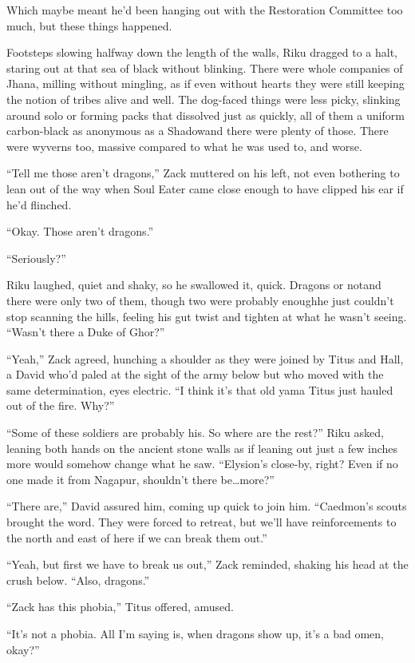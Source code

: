 Which maybe meant he'd been hanging out with the Restoration Committee too much, but these things happened.

Footsteps slowing halfway down the length of the walls, Riku dragged to a halt, staring out at that sea of black without blinking. There were whole companies of Jhana, milling without mingling, as if even without hearts they were still keeping the notion of tribes alive and well. The dog-faced things were less picky, slinking around solo or forming packs that dissolved just as quickly, all of them a uniform carbon-black as anonymous as a Shadow\textemdash and there were plenty of those. There were wyverns too, massive compared to what he was used to, and worse.

``Tell me those aren't dragons,'' Zack muttered on his left, not even bothering to lean out of the way when Soul Eater came close enough to have clipped his ear if he'd flinched.

``Okay. Those aren't dragons.''

``Seriously?''

Riku laughed, quiet and shaky, so he swallowed it, quick. Dragons or not\textemdash and there were only two of them, though two were probably enough\textemdash he just couldn't stop scanning the hills, feeling his gut twist and tighten at what he wasn't seeing. ``Wasn't there a Duke of Ghor?''

``Yeah,'' Zack agreed, hunching a shoulder as they were joined by Titus and Hall, a David who'd paled at the sight of the army below but who moved with the same determination, eyes electric. ``I think it's that old yama Titus just hauled out of the fire. Why?''

``Some of these soldiers are probably his. So where are the rest?'' Riku asked, leaning both hands on the ancient stone walls as if leaning out just a few inches more would somehow change what he saw. ``Elysion's close-by, right? Even if no one made it from Nagapur, shouldn't there be\ldots more?''

``There are,'' David assured him, coming up quick to join him. ``Caedmon's scouts brought the word. They were forced to retreat, but we'll have reinforcements to the north and east of here if we can break them out.''

``Yeah, but first we have to break us out,'' Zack reminded, shaking his head at the crush below. ``Also, dragons.''

``Zack has this phobia,'' Titus offered, amused.

``It's not a phobia. All I'm saying is, when dragons show up, it's a bad omen, okay?''

